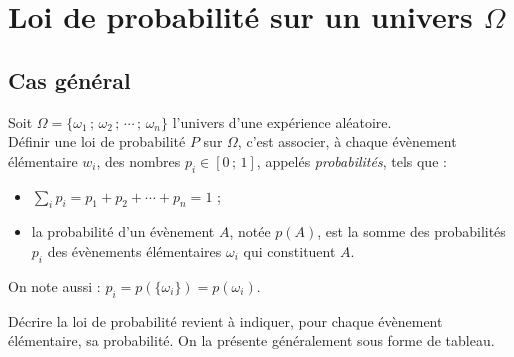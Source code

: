

\section{Loi de probabilit\'e sur un univers $\Omega$}

\subsection{Cas g\'en\'eral}

\begin{definition}
Soit $\Omega=\{\omega_1\,;\, \omega_2\,;\,\cdots\,;\,\omega_n\}$ l'univers d'une exp\'erience al\'eatoire.\\
D\'efinir une loi de probabilit\'e $P$ sur $\Omega$, c'est associer, \`a chaque
\'ev\`enement \'el\'ementaire $w_i$, des nombres $p_i \in [0\,;\,1]$, appel\'es \emph{probabilit\'es}, tels que :
\begin{itemize}
	\item $\displaystyle\sum_{i} p_i=p_1+p_2+\cdots+p_n=1$ ;
	\item la probabilit\'e d'un \'ev\`enement $A$, not\'ee $p(A)$, est la somme des probabilit\'es $p_i$ des \'ev\`enements \'el\'ementaires $\omega_i$ qui constituent $A$.
\end{itemize}
\end{definition}

\begin{rmq} On note aussi : $p_i = p(\{\omega_i\})=p(\omega_i)$.\end{rmq}

D\'ecrire la loi de probabilit\'e revient \`a indiquer, pour chaque \'ev\`enement \'el\'ementaire, sa probabilit\'e. On la pr\'esente g\'en\'eralement sous forme de tableau.

\FloatBarrier

